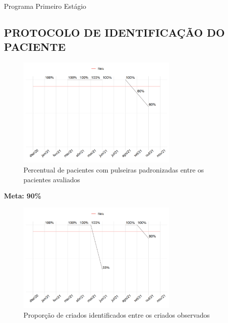 \documentclass[
  a4paper]{article}
\author{}
\date{\vspace{-2.5em}}
\begin{document}

\begin{center}
 {\LARGE Programa Primeiro Estágio}
\end{center}
\vspace{0cm}

\subsection{PROTOCOLO DE IDENTIFICAÇÃO DO PACIENTE}

\begin{figure}[H]
\caption{Percentual de pacientes com pulseiras padronizadas entre os pacientes avaliados}
\includegraphics[width=0.7\textwidth]{Imagens/pulseiras.png}
\end{figure}

\begin{center}
 \textbf{Meta: 90\%}
\end{center}

\begin{figure}[H]
\caption{Proporção de criados identificados entre os criados observados}
\includegraphics[width=0.7\textwidth]{Imagens/criado.png}
\end{figure}
\end{document}

